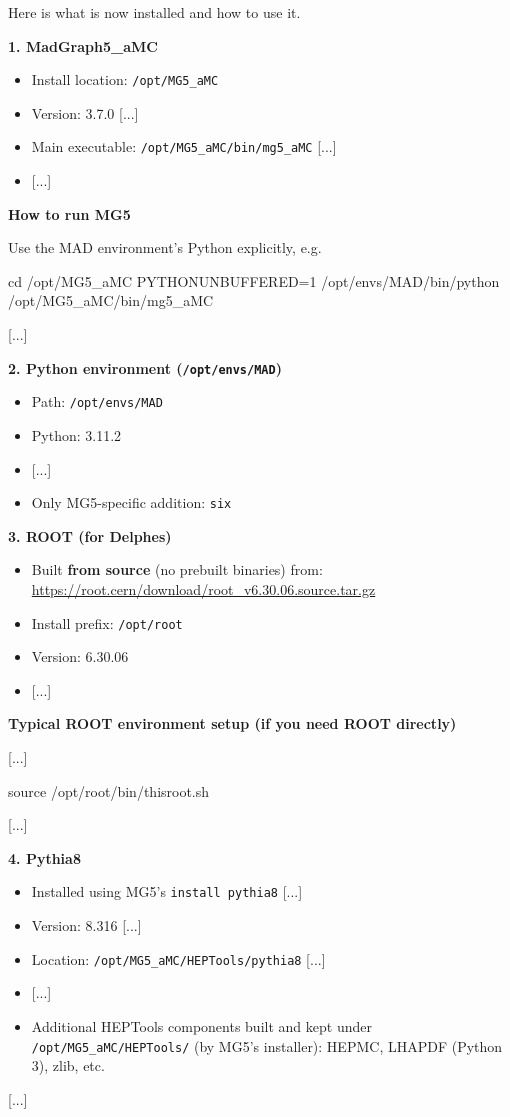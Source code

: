 \documentclass[submission, Phys]{SciPost}
\begin{document}
\begin{finalblock}[\ma (shortened)]
Here is what is now installed and how to use it.

\textbf{1. MadGraph5\_aMC}

\begin{itemize}
\item Install location: \lstinline|/opt/MG5_aMC|
\item Version: 3.7.0 [...]
\item Main executable: \lstinline|/opt/MG5_aMC/bin/mg5_aMC| [...]
\item {[...]}
\end{itemize}

\textbf{How to run MG5}

Use the MAD environment’s Python explicitly, e.g.

\begin{bashblock}
cd /opt/MG5_aMC
PYTHONUNBUFFERED=1 /opt/envs/MAD/bin/python /opt/MG5_aMC/bin/mg5_aMC
\end{bashblock}
[...]

\textbf{2. Python environment (\lstinline|/opt/envs/MAD|)}

\begin{itemize}
\item Path: \lstinline|/opt/envs/MAD|
\item Python: 3.11.2
\item {[...]}
\item Only MG5-specific addition: \lstinline|six|
\end{itemize}

\textbf{3. ROOT (for Delphes)}

\begin{itemize}
\item Built \textbf{from source} (no prebuilt binaries) from: \url{https://root.cern/download/root_v6.30.06.source.tar.gz}
\item Install prefix: \lstinline|/opt/root|
\item Version: 6.30.06
\item {[...]}
\end{itemize}

\textbf{Typical ROOT environment setup (if you need ROOT directly)}

[...]
\begin{bashblock}
source /opt/root/bin/thisroot.sh
\end{bashblock}
[...]

\textbf{4. Pythia8}

\begin{itemize}
\item Installed using MG5’s \lstinline|install pythia8| [...]
\item Version: 8.316 [...]
\item Location: \lstinline|/opt/MG5_aMC/HEPTools/pythia8| [...]
\item {[...]}
\item Additional HEPTools components built and kept under \lstinline|/opt/MG5_aMC/HEPTools/| (by MG5’s installer): HEPMC, LHAPDF (Python 3), zlib, etc.
\end{itemize}
[...]


\end{finalblock}
\end{document}

